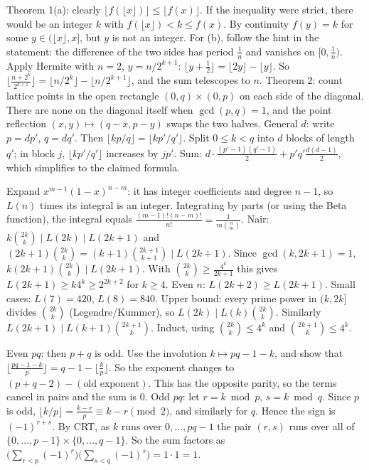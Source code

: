 \documentclass[11pt,a4paper]{article}
\begin{document}

 Theorem 1(a): clearly $\lfloor f(\lfloor x\rfloor)\rfloor\le\lfloor f(x)\rfloor$. If the inequality were strict, there would be an integer $k$ with $f(\lfloor x\rfloor)<k\le f(x)$. By continuity $f(y)=k$ for some $y\in(\lfloor x\rfloor,x]$, but $y$ is not an integer. For (b), follow the hint in the statement: the difference of the two sides has period $\frac1n$ and vanishes on $[0,\frac1n)$.
 Apply Hermite with $n=2$, $y=n/2^{k+1}$: $\lfloor y+\frac12\rfloor=\lfloor2y\rfloor-\lfloor y\rfloor$. So $\bigl\lfloor\frac{n+2^k}{2^{k+1}}\bigr\rfloor=\lfloor n/2^k\rfloor-\lfloor n/2^{k+1}\rfloor$, and the sum telescopes to $n$.
 Theorem 2: count lattice points in the open rectangle $(0,q)\times(0,p)$ on each side of the diagonal. There are none on the diagonal itself when $\gcd(p,q)=1$, and the point reflection $(x,y)\mapsto(q-x,p-y)$ swaps the two halves.
 General $d$: write $p=dp'$, $q=dq'$. Then $\lfloor kp/q\rfloor=\lfloor kp'/q'\rfloor$. Split $0\le k<q$ into $d$ blocks of length $q'$; in block $j$, $\lfloor kp'/q'\rfloor$ increases by $jp'$. Sum: $d\cdot\frac{(p'-1)(q'-1)}2+p'q'\frac{d(d-1)}2$, which simplifies to the claimed formula.

 Expand $x^{m-1}(1-x)^{n-m}$: it has integer coefficients and degree $n-1$, so $L(n)$ times its integral is an integer. Integrating by parts (or using the Beta function), the integral equals $\frac{(m-1)!(n-m)!}{n!}=\frac1{m\binom nm}$.
 Nair: $k\binom{2k}k\mid L(2k)\mid L(2k+1)$ and $(2k+1)\binom{2k}k=(k+1)\binom{2k+1}{k+1}\mid L(2k+1)$. Since $\gcd(k,2k+1)=1$, $k(2k+1)\binom{2k}k\mid L(2k+1)$. With $\binom{2k}k\ge\frac{4^k}{2k+1}$ this gives $L(2k+1)\ge k4^k\ge2^{2k+2}$ for $k\ge4$.
 Even $n$: $L(2k+2)\ge L(2k+1)$. Small cases: $L(7)=420$, $L(8)=840$.
 Upper bound: every prime power in $(k,2k]$ divides $\binom{2k}k$ (Legendre/Kummer), so $L(2k)\mid L(k)\binom{2k}k$. Similarly $L(2k+1)\mid L(k+1)\binom{2k+1}k$. Induct, using $\binom{2k}k\le4^k$ and $\binom{2k+1}k\le4^k$.

 Even $pq$: then $p+q$ is odd. Use the involution $k\mapsto pq-1-k$, and show that $\lfloor\frac{pq-1-k}p\rfloor=q-1-\lfloor\frac kp\rfloor$.
 So the exponent changes to $(p+q-2)-(\text{old exponent})$. This has the opposite parity, so the terms cancel in pairs and the sum is $0$.
 Odd $pq$: let $r=k\bmod p$, $s=k\bmod q$. Since $p$ is odd, $\lfloor k/p\rfloor=\frac{k-r}p\equiv k-r\pmod2$, and similarly for $q$. Hence the sign is $(-1)^{r+s}$.
 By CRT, as $k$ runs over $0,\dots,pq-1$ the pair $(r,s)$ runs over all of $\{0,\dots,p-1\}\times\{0,\dots,q-1\}$. So the sum factors as $\bigl(\sum_{r<p}(-1)^r\bigr)\bigl(\sum_{s<q}(-1)^s\bigr)=1\cdot1=1$.
\end{document}
